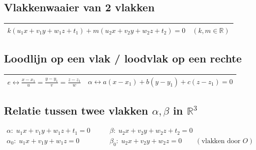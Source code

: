 \documentclass[a5paper]{article}
\begin{document}
\subsection{Vlakkenwaaier van 2 vlakken}

\begin{table}[h!]
\centering
\begin{tabular}{|c|}
\hline
$
k(u_1x + v_1y + w_1z + t_1) + m(u_2x + v_2y + w_2z + t_2) = 0 
\quad (k, m \in \mathbb{R})
$
\\
\hline
\end{tabular}
\end{table}

\subsection{Loodlijn op een vlak / loodvlak op een rechte}

\begin{table}[h!]
\centering
\begin{tabular}{|c|c|}
\hline
$
e \leftrightarrow
\frac{x - x_1}{u}
=
\frac{y - y_1}{v}
=
\frac{z - z_1}{w}
$
& 
$
\alpha \leftrightarrow a(x - x_1) + b(y - y_1) + c(z - z_1) = 0
$
\\
\hline
\end{tabular}
\end{table}




\newpage

\subsection{Relatie tussen twee vlakken $\alpha,\beta$ in $\mathbb{R}^3$}
\[
\begin{aligned}
\alpha:\; u_1 x + v_1 y + w_1 z + t_1 = 0
&\qquad
\beta:\; u_2 x + v_2 y + w_2 z + t_2 = 0 \\[2mm]
\alpha_{0}:\; u_1 x + v_1 y + w_1 z = 0
&\qquad
\beta_{0}:\; u_2 x + v_2 y + w_2 z = 0
\qquad(\text{vlakken door }O)
\end{aligned}
\]
\end{document}

